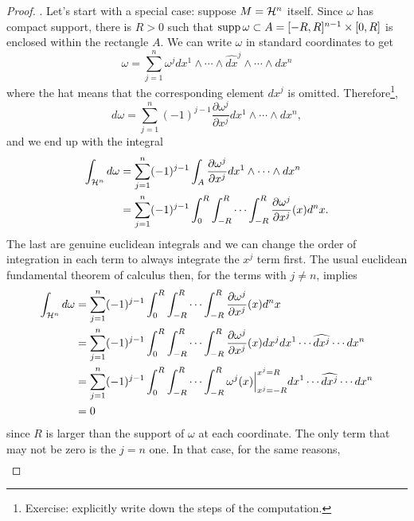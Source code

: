 \begin{proof}
  .
  Let's start with a special case: suppose $M = \mathcal{H}^n$ itself.
  Since $\omega$ has compact support, there is $R > 0$ such that $\operatorname{supp} \omega \subset A = [-R,R]^{n-1}\times[0,R]$ is enclosed within the rectangle $A$.
  We can write $\omega$ in standard coordinates to get
  \begin{equation}
    \omega = \sum_{j=1}^n \omega^j dx^1 \wedge \cdots\wedge \widehat{dx}^j \wedge \cdots\wedge dx^n
  \end{equation}
  where the hat means that the corresponding element $dx^j$ is omitted.
  Therefore\footnote{Exercise: explicitly write down the steps of the computation.},
  \begin{equation}
    d\omega = \sum_{j=1}^n (-1)^{j-1} \frac{\partial \omega^j}{\partial x^j}dx^1\wedge\cdots\wedge dx^n,
  \end{equation}
  and we end up with the integral
  \begin{align}
    \int_{\cH^n} d\omega
    &= \sum_{j=1}^n (-1)^{j-1} \int_A\frac{\partial \omega^j}{\partial x^j}dx^1\wedge\cdots\wedge dx^n \\
    &= \sum_{j=1}^n (-1)^{j-1} \int_0^R\int_{-R}^R\cdots\int_{-R}^{R}\frac{\partial \omega^j}{\partial x^j}(x) d^n x. %
  \end{align}
  The last are genuine euclidean integrals and we can change the order of integration in each term to always integrate the $x^j$ term first.
  The usual euclidean fundamental theorem of calculus then, for the terms with $j\neq n$, implies
  \begin{align}
    \int_{\cH^n} d\omega
    &= \sum_{j=1}^n (-1)^{j-1} \int_0^R\int_{-R}^R\cdots\int_{-R}^{R}\frac{\partial \omega^j}{\partial x^j}(x) d^n x \\ %
    &=\sum_{j=1}^n (-1)^{j-1} \int_0^R\int_{-R}^R\cdots\int_{-R}^{R}\frac{\partial \omega^j}{\partial x^j}(x) dx^j dx^1\cdots\widehat{dx^j}\cdots dx^n \\
    &=\sum_{j=1}^n (-1)^{j-1} \int_0^R\int_{-R}^R\cdots\int_{-R}^{R}\omega^j(x) \Big|_{x^j=-R}^{x^j=R} dx^1\cdots\widehat{dx^j}\cdots dx^n \\
    &= 0
  \end{align}
  since $R$ is larger than the support of $\omega$ at each coordinate.
  The only term that may not be zero is the $j=n$ one.
  In that case, for the same reasons,
  \begin{align}

\end{align}
\end{proof}
